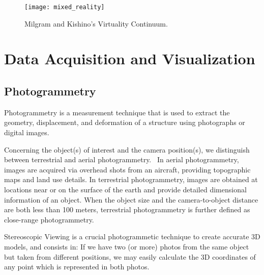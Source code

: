 \begin{figure}[htbp]
    \centering
    \texttt{[image: mixed\_reality]}
    \caption{Milgram and Kishino’s Virtuality Continuum. ~\cite{milgram1994taxonomy}}
    \label{fig:mixed_reality} 
\end{figure} 
\FloatBarrier


\section{ Data Acquisition and Visualization}
\label{sec:data}

\subsection{Photogrammetry}
\label{sec:photogrammetry}

Photogrammetry is a measurement technique that is used to extract the geometry, displacement, and deformation of a
structure using photographs or digital images.~\cite{Baqersad2017Photogrammetry}

Concerning the object(s) of interest and the camera position(s), we distinguish
between terrestrial and aerial photogrammetry.~\cite{linder2016digital}
In aerial photogrammetry, images are acquired via overhead shots from an aircraft, providing topographic maps and land use details. In terrestrial photogrammetry, images are obtained at locations near or on the surface of
the earth and provide detailed dimensional information of an object. When the object size and the camera-to-object 
distance are both less than 100 meters, terrestrial photogrammetry is further defined as close-range photogrammetry.


Stereoscopic Viewing is a crucial photogrammetic technique to create accurate \gls{3D} models, and consists in: If we have two (or more) photos
from the same object but taken from different positions, we may easily calculate the
\gls{3D} coordinates of any point which is represented in both photos.~\cite{linder2016digital}



